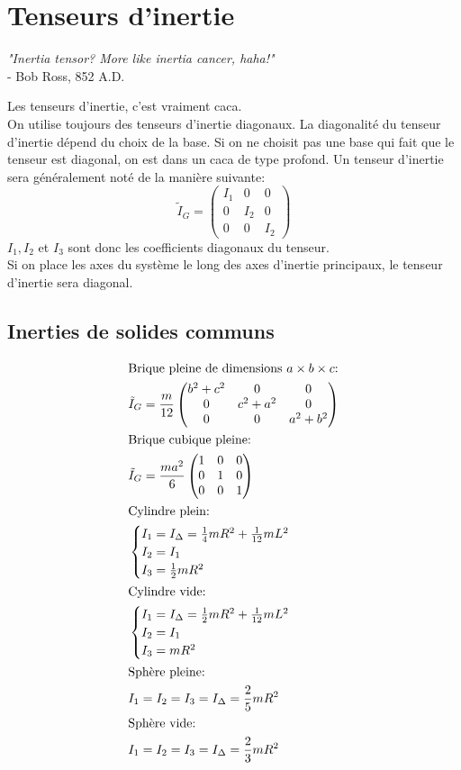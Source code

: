 \documentclass{article}
\numberwithin{equation}{section}
\begin{document}
\section{Tenseurs d'inertie}
\begin{center}
	\emph{"Inertia tensor? More like inertia cancer, haha!"} \\ \qquad \qquad - Bob Ross, 852 A.D.
\end{center}
Les tenseurs d'inertie, c'est vraiment caca. \\
On utilise toujours des tenseurs d'inertie diagonaux. La diagonalité du tenseur d'inertie dépend du choix de la base. Si on ne choisit pas une base qui fait que le tenseur est diagonal, on est dans un caca de type profond. Un tenseur d'inertie sera généralement noté de la manière suivante:
\begin{equation}
\tilde{I}_G = \begin{pmatrix}
I_1 & 0 & 0 \\
0 & I_2 & 0 \\
0 & 0 & I_2
\end{pmatrix}
\end{equation}
\(I_1, I_2\) et \(I_3\) sont donc les coefficients diagonaux du tenseur. \\
Si on place les axes du système le long des axes d'inertie principaux, le tenseur d'inertie sera diagonal.
\subsection{Inerties de solides communs}
\allowdisplaybreaks[1]
\begin{align}
\intertext{Brique pleine de dimensions \(a \times b \times c\):}
&\tilde{I}_G = \dfrac{m}{12}
\begin{pmatrix}
b^2 + c^2 & 0 & 0 \\
0 & c^2 + a^2 & 0 \\
0 & 0 & a^2 + b^2
\end{pmatrix} \\
\intertext{Brique cubique pleine:}
&\tilde{I}_G = \dfrac{ma^2}{6}
\begin{pmatrix}
1 & 0 & 0 \\
0 & 1 & 0 \\
0 & 0 & 1
\end{pmatrix} \\
\intertext{Cylindre plein:}
&\begin{cases}
I_1 = I_\Delta = \frac{1}{4}mR^2 + \frac{1}{12}mL^2 \\
I_2 = I_1 \\
I_3 = \frac{1}{2}mR^2
\end{cases} \\
\intertext{Cylindre vide:}
&\begin{cases}
I_1 = I_\Delta = \frac{1}{2}mR^2 + \frac{1}{12}mL^2 \\
I_2 = I_1 \\
I_3 = mR^2
\end{cases} \\
\intertext{Sphère pleine:}
&I_1 = I_2 = I_3 = I_\Delta = \frac{2}{5}mR^2 \\
\intertext{Sphère vide:}
&I_1 = I_2 = I_3 = I_\Delta = \frac{2}{3}mR^2
\end{align}
\allowdisplaybreaks[0]
\end{document}
